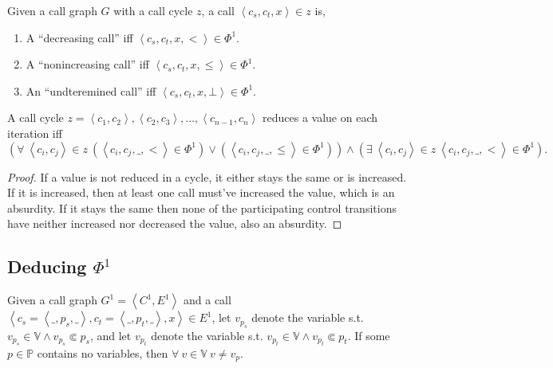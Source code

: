 \begin{definition}\label{definition:increasing-decreasing-call} Given a call
graph $G$ with a call cycle $z$, a call $\left\langle c_s,c_t,x\right\rangle\in
z$ is,

\begin{enumerate}

\item A ``decreasing call'' iff $\left\langle c_s,c_t,x,< \right\rangle \in
\Phi^1$.

\item A ``nonincreasing call'' iff $\left\langle c_s,c_t,x,\leq \right\rangle
\in \Phi^1$.

\item An ``undteremined call'' iff $\left\langle c_s,c_t,x,\bot \right\rangle
\in \Phi^1$.

\end{enumerate}

\end{definition}

\begin{lemma}\label{lemma:cycle-reduce} A call cycle $z= \left\langle c_1,c_2
\right\rangle, \left\langle c_2, c_3 \right\rangle,\ldots, \left\langle
c_{n-1}, c_n \right\rangle$ reduces a value on each iteration iff
$$\left(\forall\ \left\langle c_i,c_j \right\rangle \in z\ \left(\left\langle
c_i,c_j,\_, < \right\rangle \in \Phi^1\right) \vee \left(\left\langle
c_i,c_j,\_, \leq \right\rangle \in \Phi^1 \right)\right)\wedge \left( \exists\
\left\langle c_i,c_j \right\rangle \in z\ \left\langle c_i,c_j,\_, <
\right\rangle \in \Phi^1 \right).$$\end{lemma}

\begin{proof} If a value is not reduced in a cycle, it either stays the same or
is increased. If it is increased, then at least one call must've increased the
value, which is an absurdity. If it stays the same then none of the
participating control transitions have neither increased nor decreased the
value, also an absurdity.\end{proof}

\subsection{Deducing $\Phi^1$}

\begin{definition} Given a call graph $G^1 = \left\langle C^1,
E^1\right\rangle$ and a call $\left\langle c_s = \left\langle \_,p_s,\_
\right\rangle, c_t = \left\langle \_, p_t, \_ \right\rangle, x \right\rangle
\in E^1$, let $v_{p_s}$ denote the variable s.t. $v_{p_s}\in\mathbb{V}\wedge
v_{p_s}\Subset p_s$, and let $v_{p_t}$ denote the variable s.t.
$v_{p_t}\in\mathbb{V}\wedge v_{p_t}\Subset p_t$. If some $p\in\mathbb{P}$
contains no variables, then $\forall\ v\in\mathbb{V}\ v\neq
v_p$.\end{definition}

